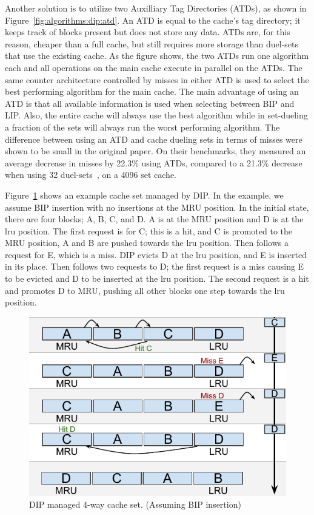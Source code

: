 Another solution is to utilize two Auxilliary Tag Directories (ATDs), as shown in Figure~\ref{fig:algorithms:dip:atd}.
An ATD is equal to the cache's tag directory; it keeps track of blocks present but does not store any data.
ATDs are, for this reason, cheaper than a full cache, but still requires more storage than duel-sets that use the existing cache.
As the figure shows, the two ATDs run one algorithm each and all operations on the main cache execute in parallel on the ATDs.
The same counter architecture controlled by misses in either ATD is used to select the best performing algorithm for the main cache.
The main advantage of using an ATD is that all available information is used when selecting between BIP and LIP.
Also, the entire cache will always use the best algorithm while in set-dueling a fraction of the sets will always run the worst performing algorithm.
The difference between using an ATD and cache dueling sets in terms of misses were shown to be small in the original paper.
On their benchmarks, they measured an average decrease in misses by 22.3\% using ATDs, compared to a 21.3\% decrease when using 32 duel-sets~\cite{Qureshi2007}, on a 4096 set cache.

Figure~\ref{fig:algorithms:bip_example} shows an example cache set managed by DIP.
In the example, we assume BIP insertion with no insertions at the MRU position.
In the initial state, there are four blocks; A, B, C, and D.
A is at the MRU position and D is at the \gls{lru} position.
The first request is for C; this is a hit, and C is promoted to the MRU position, A and B are pushed towards the \gls{lru} position.
Then follows a request for E, which is a miss.
DIP evicts D at the \gls{lru} position, and E is inserted in its place.
Then follows two requests to D; the first request is a miss causing E to be evicted and D to be inserted at the \gls{lru} position.
The second request is a hit and promotes D to MRU, pushing all other blocks one step towards the \gls{lru} position.

\begin{figure}[ht]
    \centering
    \includegraphics[width=.65\textwidth]{figures/algorithms/DIP}
    \caption[DIP managed 4-way cache set.]{DIP managed 4-way cache set. (Assuming BIP insertion)}
    \label{fig:algorithms:bip_example}
\end{figure}
